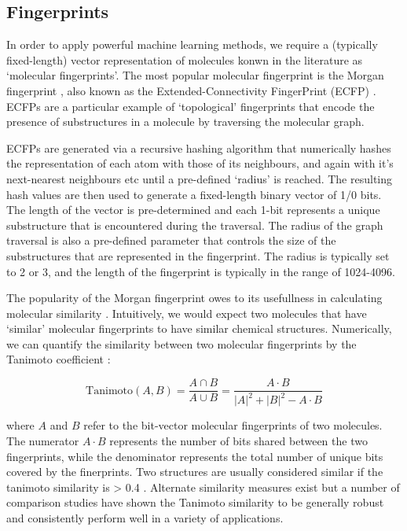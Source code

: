 \subsection{Fingerprints} \label{subsec:fingerprints}

In order to apply powerful machine learning methods, we require a (typically fixed-length) vector representation of molecules konwn in the literature as `molecular fingerprints'. The most popular molecular fingerprint is the Morgan fingerprint \cite{morgan1965fingerprints}, also known as the Extended-Connectivity FingerPrint (ECFP) \cite{rogers2010extended}. ECFPs are a particular example of `topological' fingerprints that encode the presence of substructures in a molecule by traversing the molecular graph.

ECFPs are generated via a recursive hashing algorithm that numerically hashes the representation of each atom with those of its neighbours, and again with it's next-nearest neighbours etc until a pre-defined `radius' is reached. The resulting hash values are then used to generate a fixed-length binary vector of 1/0 bits. The length of the vector is pre-determined and each 1-bit represents a unique substructure that is encountered during the traversal. The radius of the graph traversal is also a pre-defined parameter that controls the size of the substructures that are represented in the fingerprint. The radius is typically set to 2 or 3, and the length of the fingerprint is typically in the range of 1024-4096.

The popularity of the Morgan fingerprint owes to its usefullness in calculating molecular similarity \cite{Maggiora2014similarity}. Intuitively, we would expect two molecules that have `similar' molecular fingerprints to have similar chemical structures. Numerically, we can quantify the similarity between two molecular fingerprints by the Tanimoto coefficient \cite{Willet1998similarity}:

\begin{equation} \label{eqn:tanimoto}
    \mathrm{Tanimoto}(A, B) = \frac{A \cap B}{A \cup B} = \frac{A \cdot B}{|A|^{2} + |B|^{2} - A \cdot B}
\end{equation}

where $A$ and $B$ refer to the bit-vector molecular fingerprints of two molecules. The numerator $A \cdot B$ represents the number of bits shared between the two fingerprints, while the denominator represents the total number of unique bits covered by the finerprints. Two structures are usually considered similar if the tanimoto similarity is > 0.4 \cite{baldi2010similarity}. Alternate similarity measures exist but a number of comparison studies \cite{Todeschini2012tanimoto, Bajusz2015Tanimoto} have shown the Tanimoto similarity to be generally robust and consistently perform well in a variety of applications.

